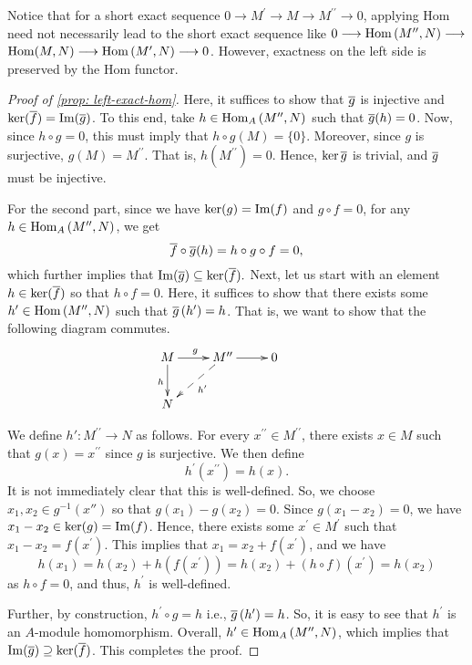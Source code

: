 Notice that for a short exact sequence $0 \longrightarrow M^{\prime} \longrightarrow M \longrightarrow M^{\prime \prime} \longrightarrow 0$, applying Hom need not necessarily lead to the short exact sequence like $0 \longrightarrow \operatorname{\text{Hom\/}}\left(M^{\prime \prime}, N\right) \longrightarrow$ $\operatorname{\text{Hom\/}}(M, N) \longrightarrow \operatorname{\text{Hom\/}}\left(M^{\prime}, N\right) \longrightarrow 0$. However, exactness on the left side is preserved by the Hom functor.
\begin{proof}[Proof of \cref{prop: left-exact-hom}]
    Here, it suffices to show that $\overline{g}$ is injective and ${\operatorname{\text{ker\/}}}(\overline{f})=\operatorname{Im}(\overline{g})$. To this end, take $h \in \operatorname{\text{Hom\/}}_{A}\left(M^{\prime \prime}, N\right)$ such that $\overline{g}(h)=0$. Now, since $h \circ g=0$, this must imply that $h \circ g(M)=\{0\}$. Moreover, since $g$ is surjective, $g(M)=M^{\prime \prime}$. That is, $h\left(M^{\prime \prime}\right)=0$. Hence, $\operatorname{\text{ker\/}}{\overline{g}}$ is trivial, and $\overline{g}$ must be injective.
    
    For the second part, since we have ${\operatorname{\text{ker\/}}}(g)=\operatorname{Im}(f)$ and $g \circ f=0$, for any $h \in\operatorname{\text{Hom\/}}_{A}\left(M^{\prime \prime}, N\right)$, we get 
    \[
    \overline{f} \circ \overline{g}(h)=h \circ g \circ f=0,
    \] which further implies that 
    \(
    \operatorname{Im}(\overline{g}) \subseteq {\operatorname{\text{ker\/}}}(\overline{f}).\)
    Next, let us start with an element $h \in {\operatorname{\text{ker\/}}}(\overline{f})$ so that $h \circ f=0$. Here, it suffices to show that there exists some $h^{\prime} \in \operatorname{\text{Hom\/}}\left(M^{\prime \prime}, N\right)$ such that $\overline{g}\left(h^{\prime}\right)=h$. That is, we want to show that the following diagram commutes.
    \[
    \xymatrix{
    M \ar[d]_{h} \ar[r]^{g} & M^{\prime \prime} \ar@{-->}[dl]^{h'} \ar[r] & 0\\
    N & & &
    }
    \]
    
    We define $h'\colon M^{\prime \prime} \to N$ as follows.
    For every $x^{\prime \prime} \in M^{\prime \prime}$, there exists $x \in M$ such that $g(x)=x^{\prime \prime}$ since $g$ is surjective. We then define 
    \[
    h^{\prime}\left(x^{\prime \prime}\right)=h(x).
    \]
    It is not immediately clear that this is well-defined. So, we choose $x_{1}, x_2 \in g^{-1}(x'')$ so that  $g\left(x_{1}\right)-g\left(x_{2}\right)=0$. Since $g\left(x_{1}-x_{2}\right)=0$, we have $x_{1}-x_{2} \in {\operatorname{\text{ker\/}}}(g)=\operatorname{Im}(f)$. Hence, there exists some $x^{\prime} \in M^{\prime}$ such that $x_{1}-x_{2}=f\left(x^{\prime}\right)$. This implies that $x_{1}=x_{2}+f\left(x^{\prime}\right)$, and we have
    \[
    h\left(x_{1}\right)=h\left(x_{2}\right)+h\left(f\left(x^{\prime}\right)\right)= h\left(x_{2}\right)+(h \circ f)\left(x^{\prime}\right)=h\left(x_{2}\right)
    \] as $h \circ f=0$, and thus, $h^{\prime}$ is well-defined. 
    
    Further, by construction, $h^{\prime} \circ g=h$ i.e., $\overline{g}\left(h^{\prime}\right)=h$. So, it is easy to see that $h^{\prime}$ is an $A$-module homomorphism.
    Overall, $h^{\prime} \in \operatorname{\text{Hom\/}}_{A}\left(M^{\prime \prime}, N\right)$, which implies that $\operatorname{Im}(\overline{g}) \supseteq {\operatorname{\text{ker\/}}}(\overline{f})$. This completes the proof.
\end{proof}

